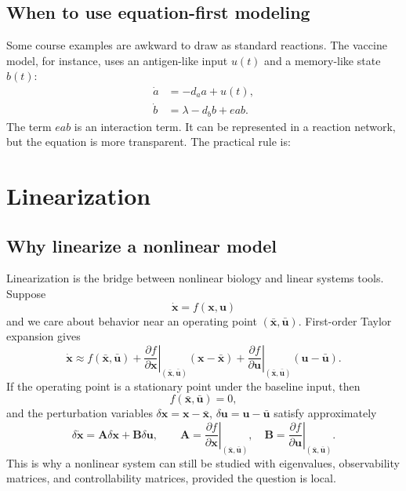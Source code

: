\documentclass[a4paper]{article}
\newcommand{\vect}[1]{\boldsymbol{#1}}
\newcommand{\mat}[1]{\mathbf{#1}}
\newcommand{\A}{\mat A}
\newcommand{\B}{\mat B}
\begin{document}
\subsection{When to use equation-first modeling}

Some course examples are awkward to draw as standard reactions. The vaccine model, for instance, uses an antigen-like input \(u(t)\) and a memory-like state \(b(t)\):
\[
  \begin{aligned}
  \dot a &= -d_a a+u(t),\\
  \dot b &= \lambda-d_b b+eab.
  \end{aligned}
\]
The term \(eab\) is an interaction term. It can be represented in a reaction network, but the equation is more transparent. The practical rule is:
\begin{center}
\end{center}

\section{Linearization}

\subsection{Why linearize a nonlinear model}

Linearization is the bridge between nonlinear biology and linear systems tools. Suppose
\[
  \dot{\vect x}=f(\vect x,\vect u)
\]
and we care about behavior near an operating point \((\bar{\vect x},\bar{\vect u})\). First-order Taylor expansion gives
\[
  \dot{\vect x}
  \approx
  f(\bar{\vect x},\bar{\vect u})
  +\left.\frac{\partial f}{\partial \vect x}\right|_{(\bar{\vect x},\bar{\vect u})}
   (\vect x-\bar{\vect x})
  +\left.\frac{\partial f}{\partial \vect u}\right|_{(\bar{\vect x},\bar{\vect u})}
   (\vect u-\bar{\vect u}).
\]
If the operating point is a stationary point under the baseline input, then
\[
  f(\bar{\vect x},\bar{\vect u})=0,
\]
and the perturbation variables \(\delta\vect x=\vect x-\bar{\vect x}\), \(\delta\vect u=\vect u-\bar{\vect u}\) satisfy approximately
\[
  \delta\dot{\vect x}=\A\delta\vect x+\B\delta\vect u,
  \qquad
  \A=\left.\frac{\partial f}{\partial \vect x}\right|_{(\bar{\vect x},\bar{\vect u})},
  \quad
  \B=\left.\frac{\partial f}{\partial \vect u}\right|_{(\bar{\vect x},\bar{\vect u})}.
\]
This is why a nonlinear system can still be studied with eigenvalues, observability matrices, and controllability matrices, provided the question is local.
\end{document}
